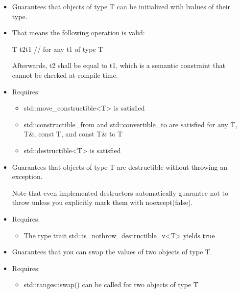 
\begin{itemize}
\item
Guarantees that objects of type T can be initialized with lvalues of their type.

\item
That means the following operation is valid:

\begin{cpp}
T t2{t1} // for any t1 of type T
\end{cpp}

Afterwards, t2 shall be equal to t1, which is a semantic constraint that cannot be checked at compile time.

\item
Requires:
\begin{itemize}
\item
std::move\_constructible<T> is satisfied

\item
std::constructible\_from and std::convertible\_to are satisfied for any T, T\&, const T, and const T\& to T

\item
std::destructible<T> is satisfied
\end{itemize}
\end{itemize}


\begin{itemize}
\item
Guarantees that objects of type T are destructible without throwing an exception.

Note that even implemented destructors automatically guarantee not to throw unless you explicitly mark them with noexcept(false).

\item
Requires:
\begin{itemize}
\item
The type trait std::is\_nothrow\_destructible\_v<T> yields true
\end{itemize}
\end{itemize}


\begin{itemize}
\item
Guarantees that you can swap the values of two objects of type T.

\item
Requires:
\begin{itemize}
\item
std::ranges::swap() can be called for two objects of type T
\end{itemize}
\end{itemize}

